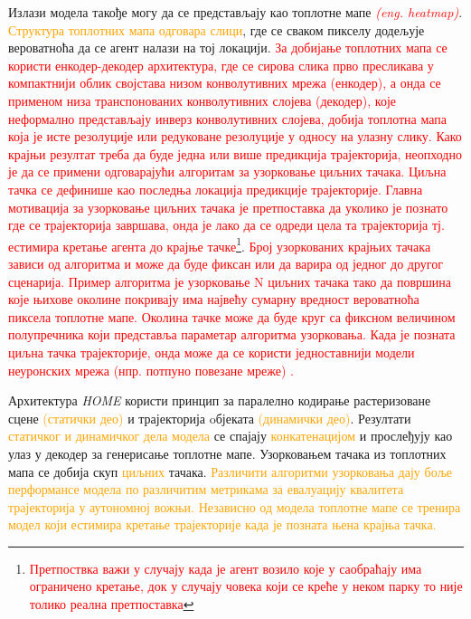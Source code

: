 \documentclass[11pt,oneside]{memoir}
\begin{document}
Излази модела такође могу да се представљају као топлотне мапе \textcolor{red}{\textit{(eng. heatmap)}}. \textcolor{orange}{Структура топлотних мапа
одговара слици}, где се сваком пикселу додељује вероватноћа
да се агент налази на тој локацији. \textcolor{red}{За добијање топлотних мапа се користи енкодер-декодер архитектура, где се сирова слика
прво пресликава у компактнији облик својстава низом конволутивних мрежа (енкодер), а онда се 
применом низа транспонованих конволутивних слојева (декодер), које неформално представљају инверз конволутивних слојева, добија
топлотна мапа која је исте резолуције или редуковане резолуције у односу на улазну слику.
Како крајњи резултат треба да буде једна или више предикција трајекторија, неопходно је да се примени одговарајући алгоритам за
узорковање циљних тачака. Циљна тачка
се дефинише као последња локација предикције трајекторије. Главна мотивација за узорковање циљних тачака је претпоставка да уколико је познато где се
трајекторија завршава, онда је лако да се одреди цела та трајекторија тј. естимира кретање агента до крајње тачке}\footnote{\textcolor{red}{Претпоствка важи 
у случају када је агент возило које у саобраћају има ограничено кретање, док у случају човека који се креће у неком парку то није толико реална
претпоставка}}. \textcolor{red}{Број узоркованих крајњих тачака зависи од алгоритма и може да буде фиксан или да варира од једног до другог сценарија. 
Пример алгоритма је узорковање N циљних тачака тако да површина које њихове околине покривају има највећу сумарну вредност вероватноћа 
пиксела топлотне мапе. Околина
тачке може да буде круг са фиксном величином полупречника који представља параметар алгоритма узорковања. Када је позната циљна тачка трајекторије,
онда може да се користи једноставнији модели неуронских мрежа (нпр. потпуно повезане мреже) \cite{home, centernet}.}

Архитектура \textit{HOME} \cite{home} користи принцип за паралелно кодирање растеризоване сцене \textcolor{orange}{(статички део)} 
и трајекторија oбјеката \textcolor{orange}{(динамички део)}. Резултати
\textcolor{orange}{статичког и динамичког дела модела} се спајају \textcolor{orange}{конкатенацијом} и прослеђују као улаз у декодер за генерисање топлотне мапе. 
Узорковањем тачака из топлотних мапа се добија скуп \textcolor{orange}{циљних} тачака. \textcolor{orange}{Различити алгоритми узорковања дају
боље перформансе модела по различитим метрикама за евалуацију квалитета трајекторија у аутономној вожњи. Независно од модела топлотне мапе
се тренира модел који естимира кретање трајекторије када је позната њена крајња тачка.}
\end{document}
